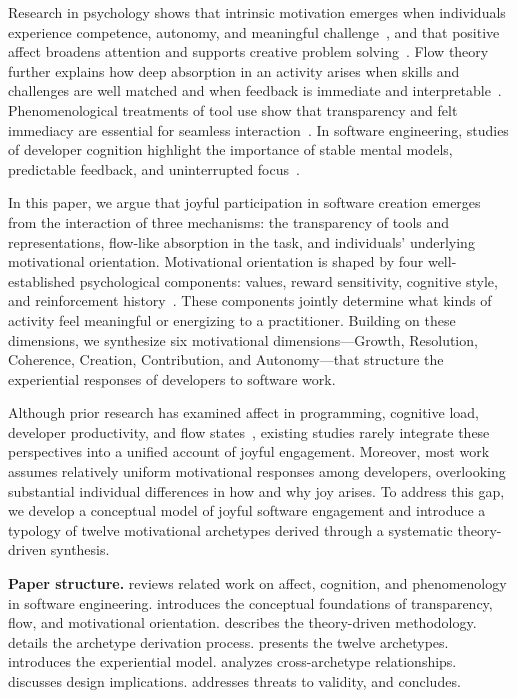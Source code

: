 \documentclass[12pt]{elsarticle}
\begin{document}
Research in psychology shows that intrinsic motivation emerges when 
individuals experience competence, autonomy, and meaningful 
challenge~\cite{deci2013,ryan2000}, and that positive affect broadens 
attention and supports creative problem solving~\cite{fredrickson2001}. 
Flow theory further explains how deep absorption in an activity arises 
when skills and challenges are well matched and when feedback is 
immediate and interpretable~\cite{csikszentmihalyi1990}. 
Phenomenological treatments of tool use show that transparency and felt 
immediacy are essential for seamless interaction~\cite{heidegger1962,ihde1990}. 
In software engineering, studies of developer cognition highlight the 
importance of stable mental models, predictable feedback, and 
uninterrupted focus~\cite{parnin2011,soloway2009}.

In this paper, we argue that joyful participation in software creation 
emerges from the interaction of three mechanisms: the transparency of 
tools and representations, flow-like absorption in the task, and 
individuals' underlying motivational orientation. Motivational 
orientation is shaped by four well-established psychological components: 
values, reward sensitivity, cognitive style, and reinforcement 
history~\cite{gray1987,messick1976}. These components jointly determine 
what kinds of activity feel meaningful or energizing to a practitioner. 
Building on these dimensions, we synthesize six motivational 
dimensions---Growth, Resolution, Coherence, Creation, Contribution, and 
Autonomy---that structure the experiential responses of developers to 
software work.

Although prior research has examined affect in programming, cognitive 
load, developer productivity, and flow states~\cite{csikszentmihalyi1990,
ford2015,graziotin2014,parnin2011}, existing studies rarely integrate 
these perspectives into a unified account of joyful engagement. Moreover, 
most work assumes relatively uniform motivational responses among 
developers, overlooking substantial individual differences in how and why 
joy arises. To address this gap, we develop a conceptual model of joyful 
software engagement and introduce a typology of twelve motivational 
archetypes derived through a systematic theory-driven synthesis.

\medskip
\noindent\textbf{Paper structure.}
 reviews related work on affect, cognition, and 
phenomenology in software engineering.  introduces 
the conceptual foundations of transparency, flow, and motivational 
orientation.  describes the theory-driven 
methodology.  details the archetype derivation 
process.  presents the twelve archetypes. 
 introduces the experiential model.  
analyzes cross-archetype relationships.  discusses 
design implications.  addresses threats to validity, 
and  concludes.
\end{document}
